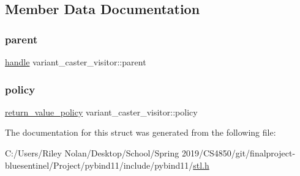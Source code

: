 \subsection{Member Data Documentation}
\mbox{\label{structvariant__caster__visitor_a9997bb93f907d349f13930002b7981bf}} 
\subsubsection{\texorpdfstring{parent}{parent}}
{\footnotesize\ttfamily \mbox{\hyperlink{classhandle}{handle}} variant\+\_\+caster\+\_\+visitor\+::parent}

\mbox{\label{structvariant__caster__visitor_a9cb67ab0573177ee440eb39af186293d}} 
\subsubsection{\texorpdfstring{policy}{policy}}
{\footnotesize\ttfamily \mbox{\hyperlink{detail_2common_8h_adde72ab1fb0dd4b48a5232c349a53841}{return\+\_\+value\+\_\+policy}} variant\+\_\+caster\+\_\+visitor\+::policy}



The documentation for this struct was generated from the following file\+:\begin{DoxyCompactItemize}
\item 
C\+:/\+Users/\+Riley Nolan/\+Desktop/\+School/\+Spring 2019/\+C\+S4850/git/finalproject-\/bluesentinel/\+Project/pybind11/include/pybind11/\mbox{\hyperlink{stl_8h}{stl.\+h}}\end{DoxyCompactItemize}
